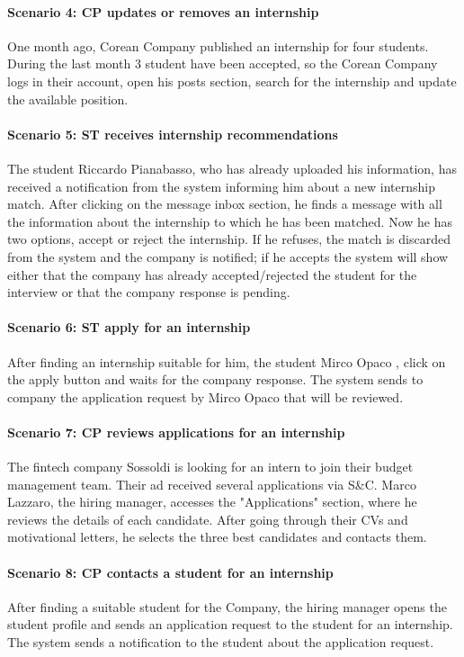\paragraph{Scenario 4: CP updates or removes an internship}
One month ago, Corean Company published an internship for four students. During the last month 3 student have been accepted, so the Corean Company logs in their account, open his posts section, search for the internship and update the available position.

\paragraph{Scenario 5: ST receives internship recommendations}
The student Riccardo Pianabasso, who has already uploaded his information, has received a notification from the system informing him about a new internship match. After clicking on the message inbox section, he finds a message with all the information about the internship to which he has been matched. Now he has two options, accept or reject the internship. If he refuses, the match is discarded from the system and the company is notified; if he accepts the system will show either that the company has already accepted/rejected the student for the interview or that the company response is pending.

\paragraph{Scenario 6: ST apply for an internship}
After finding an internship suitable for him, the student Mirco Opaco , click on the apply button and waits for the company response.
The system sends to company the application request by Mirco Opaco that will be reviewed.

\paragraph{Scenario 7: CP reviews applications for an internship}
The fintech company Sossoldi is looking for an intern to join their budget management team. Their ad received several applications via S\&C. Marco Lazzaro, the hiring manager, accesses the "Applications" section, where he reviews the details of each candidate. After going through their CVs and motivational letters, he selects the three best candidates and contacts them.

\paragraph{Scenario 8: CP contacts a student for an internship}
After finding a suitable student for the Company, the hiring manager opens the student profile and sends an application request to the student for an internship.
The system sends a notification to the student about the application request.

